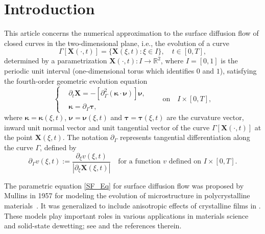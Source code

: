 \documentclass[review]{elsarticle}
\def\R{{\mathbb R}}
\begin{document}

\section{Introduction}\label{sec:intro}

This article concerns the numerical approximation to the surface diffusion flow of closed curves in the two-dimensional plane, i.e., the evolution of a curve
$$
\Gamma[\mathbf X(\cdot,t)] = \{\mathbf X(\xi,t): \xi \in I \}, \quad t\in[0,T],
$$
determined by a parametrization $\mathbf X(\cdot,t):I\rightarrow \R^2$, where $I=[0,1]$ is the periodic unit interval  (one-dimensional torus which identifies $0$ and $1$), satisfying the fourth-order geometric evolution equation
\begin{equation}\label{SF_Eq}
\left\{
\begin{aligned}
     &\partial_t\mathbf{X} = - [\partial_{\Gamma}^2 (\boldsymbol\kappa\cdot \boldsymbol\nu)]\boldsymbol\nu,\\
     &\boldsymbol\kappa = \partial_{\Gamma} \boldsymbol{\tau},
\end{aligned}
\right.  \qquad \text{on} \quad   I \times [0,T],
\end{equation}
where $\boldsymbol\kappa=\boldsymbol\kappa(\xi, t)$, $\boldsymbol\nu= \boldsymbol\nu(\xi, t)$ and $\boldsymbol\tau= \boldsymbol\tau(\xi, t)$ are the curvature vector, inward unit normal vector and unit tangential vector of the curve $\Gamma[\mathbf X(\cdot,t)]$ at the point $\mathbf X(\xi,t)$. The notation $\partial_\Gamma$ represents tangential differentiation along the curve $\Gamma$, defined by
$$
\partial_\Gamma v(\xi,t) := \frac{\partial_\xi v(\xi,t)}{|\partial_\xi \mathbf X(\xi,t)|} \quad\mbox{for a function $v$ defined on $I\times[0,T]$} .
$$

The parametric equation \eqref{SF_Eq} for surface diffusion flow was proposed by Mullins in 1957 for modeling the evolution of microstructure in polycrystalline materials~\cite{Mullins57}. It was generalized to include anisotropic effects of crystalline films in  \cite{Cahn94,Gurtin02,LiBo09,Torabi10}. These models play important roles in various applications in materials science and solid-state dewetting; see \cite{Thompson12,Jiang12,Wang15,Jiang16,Bao17b,Jiang18a,Jiang18b,Jiang19c} and the references therein.
\end{document}
